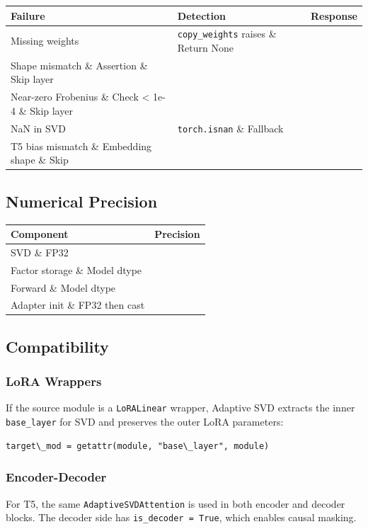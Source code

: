 \begin{table}[H]
\centering
\small
\begin{tabular}{lll}
\toprule
\textbf{Failure} & \textbf{Detection} & \textbf{Response} \\
\midrule
Missing weights & \texttt{copy\_weights} raises \& Return None \\
Shape mismatch \& Assertion \& Skip layer \\
Near-zero Frobenius \& Check \textless{} 1e-4 \& Skip layer \\
NaN in SVD & \texttt{torch.isnan} \& Fallback \\
T5 bias mismatch \& Embedding shape \& Skip \\
\bottomrule
\end{tabular}
\end{table}

\subsection{Numerical Precision}

\begin{table}[H]
\centering
\small
\begin{tabular}{ll}
\toprule
\textbf{Component} & \textbf{Precision} \\
\midrule
SVD \& FP32 \\
Factor storage \& Model dtype \\
Forward \& Model dtype \\
Adapter init \& FP32 then cast \\
\bottomrule
\end{tabular}
\end{table}

\subsection{Compatibility}

\subsubsection{LoRA Wrappers}

If the source module is a \texttt{LoRALinear} wrapper, Adaptive SVD extracts the 
inner \texttt{base\_layer} for SVD and preserves the outer LoRA parameters:

\begin{lstlisting}
target\_mod = getattr(module, "base\_layer", module)
\end{lstlisting}

\subsubsection{Encoder-Decoder}

For T5, the same \texttt{AdaptiveSVDAttention} is used in both encoder and decoder 
blocks. The decoder side has \texttt{is\_decoder = True}, which enables causal masking.
